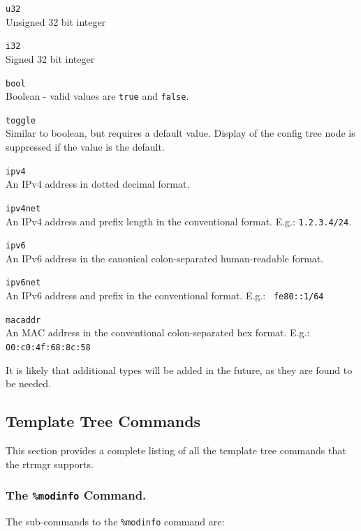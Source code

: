 \documentclass[11pt]{article}
\begin{document}
\begin{description}
\item{\tt u32}\\
Unsigned 32 bit integer
\item{\tt i32}\\
Signed 32 bit integer
\item{\tt bool}\\
Boolean - valid values are {\tt true} and {\tt false}.
\item{\tt toggle}\\
Similar to boolean, but requires a default value.  Display of the
config tree node is suppressed if the value is the default.
\item{\tt ipv4}\\
An IPv4 address in dotted decimal format.
\item{\tt ipv4net}\\ An IPv4 address and prefix length in the
conventional format.  E.g.: {\tt 1.2.3.4/24}.
\item{\tt ipv6}\\
An IPv6 address in the canonical colon-separated human-readable format.
\item{\tt ipv6net}\\
An IPv6 address and prefix in the conventional format. E.g.: {\tt
fe80::1/64}
\item{\tt macaddr}\\
An MAC address in the conventional colon-separated hex format.  E.g.:
{\tt 00:c0:4f:68:8c:58}
\end{description}

It is likely that additional types will be added in the future, as
they are found to be needed.

\newpage

\subsection{Template Tree Commands}
This section provides a complete listing of all the template tree
commands that the rtrmgr supports.

\subsubsection{The {\tt \%modinfo} Command.}
The sub-commands to the {\tt \%modinfo} command are:
\end{document}
